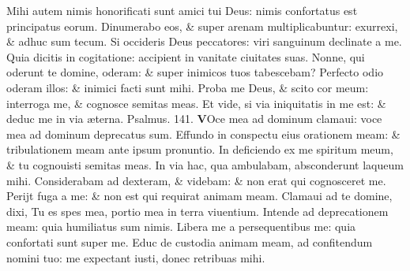 \documentclass[a5paper,10pt]{book}
\def\ae{æ}
\begin{document}
\begin{multicols*}{2}
\newline \color{red} M\color{black}ihi autem nimis honorificati sunt amici tui Deus: nimis confortatus est principatus eorum.
\newline \color{red} D\color{black}inumerabo eos, \& super arenam multiplicabuntur: exurrexi, \& adhuc sum tecum.
\newline \color{red} S\color{black}i occideris Deus peccatores: viri sanguinum declinate a me.
\newline \color{red} Q\color{black}uia dicitis in cogitatione: accipient in vanitate ciuitates suas.%
\newline \color{red} N\color{black}onne, qui oderunt te domine, oderam: \& super inimicos tuos tabescebam?
\newline \color{red} P\color{black}erfecto odio oderam illos: \& inimici facti sunt mihi.
\newline \color{red} P\color{black}roba me Deus, \& scito cor meum: interroga me, \& cognosce semitas meas.
\newline \color{red} E\color{black}t vide, si via iniquitatis in me est: \& deduc me in via \ae terna. \color{red} Psalmus. \hypertarget{ps141}{141.} \color{black}
\vspace{-1.25em}
\lettrine[lines=2]{\bfseries \color{red} V}{}Oce mea ad dominum clamaui: voce mea ad dominum deprecatus sum.
\newline \color{red} E\color{black}ffundo in conspectu eius orationem meam: \& tribulationem meam ante ipsum pronuntio.
\newline \color{red} I\color{black}n deficiendo ex me spiritum meum, \& tu cognouisti semitas meas.
\newline \color{red} I\color{black}n via hac, qua ambulabam, absconderunt laqueum mihi.
\newline \color{red} C\color{black}onsiderabam ad dexteram, \& videbam: \& non erat qui cognosceret me.
\newline \color{red} P\color{black}erijt fuga a me: \& non est qui requirat animam meam.
\newline \color{red} C\color{black}lamaui ad te domine, dixi, Tu es spes mea, portio mea in terra viuentium.
\newline \color{red} I\color{black}ntende ad deprecationem meam: quia humiliatus sum nimis.
\newline \color{red} L\color{black}ibera me a persequentibus me: quia confortati sunt super me.
\newline \color{red} E\color{black}duc de custodia animam meam, ad confitendum nomini tuo: me expectant iusti, donec retribuas mihi.

\end{multicols*}
\end{document}
